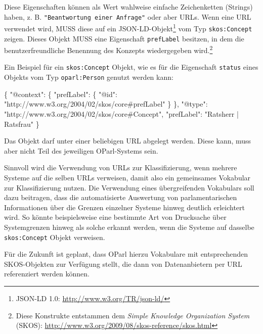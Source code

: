 \documentclass[,a4paper]{article}
\newenvironment{Shaded}{}{}
\newcommand{\DataTypeTok}[1]{\textcolor[rgb]{0.56,0.13,0.00}{{#1}}}
\newcommand{\StringTok}[1]{\textcolor[rgb]{0.25,0.44,0.63}{{#1}}}
\newcommand{\FunctionTok}[1]{\textcolor[rgb]{0.02,0.16,0.49}{{#1}}}
\begin{document}
Diese Eigenschaften können als Wert wahlweise einfache Zeichenketten
(Strings) haben, z. B. \texttt{"Beantwortung einer Anfrage"} oder aber
URLs. Wenn eine URL verwendet wird, MUSS diese auf ein
JSON-LD-Objekt\footnote{JSON-LD 1.0: \url{http://www.w3.org/TR/json-ld/}}
vom Typ \texttt{skos:Concept} zeigen. Dieses Objekt MUSS eine
Eigenschaft \texttt{prefLabel} besitzen, in dem die benutzerfreundliche
Benennung des Konzepts wiedergegeben wird.\footnote{Diese Konstrukte
  entstammen dem \emph{Simple Knowledge Organization System} (SKOS):
  \url{http://www.w3.org/2009/08/skos-reference/skos.html}}

Ein Beispiel für ein \texttt{skos:Concept} Objekt, wie es für die
Eigenschaft \texttt{status} eines Objekts vom Typ \texttt{oparl:Person}
genutzt werden kann:

\begin{Shaded}
\begin{Highlighting}[]
\FunctionTok{\{}
    \DataTypeTok{"@context"}\FunctionTok{:} \FunctionTok{\{}
        \DataTypeTok{"prefLabel"}\FunctionTok{:} \FunctionTok{\{}
            \DataTypeTok{"@id"}\FunctionTok{:} \StringTok{"http://www.w3.org/2004/02/skos/core#prefLabel"}
        \FunctionTok{\}}
    \FunctionTok{\},}
    \DataTypeTok{"@type"}\FunctionTok{:} \StringTok{"http://www.w3.org/2004/02/skos/core#Concept"}\FunctionTok{,}
    \DataTypeTok{"prefLabel"}\FunctionTok{:} \StringTok{"Ratsherr | Ratsfrau"}
\FunctionTok{\}}
\end{Highlighting}
\end{Shaded}

Das Objekt darf unter einer beliebigen URL abgelegt werden. Diese kann,
muss aber nicht Teil des jeweiligen OParl-Systems sein.

Sinnvoll wird die Verwendung von URLs zur Klassifizierung, wenn mehrere
Systeme auf die selben URLs verweisen, damit also ein gemeinsames
Vokabular zur Klassifizierung nutzen. Die Verwendung eines
übergreifenden Vokabulars soll dazu beitragen, dass die automatisierte
Auswertung von parlamentarischen Informationen über die Grenzen
einzelner Systeme hinweg deutlich erleichtert wird. So könnte
beispielsweise eine bestimmte Art von Drucksache über Systemgrenzen
hinweg als solche erkannt werden, wenn die Systeme auf dasselbe
\texttt{skos:Concept} Objekt verweisen.

Für die Zukunft ist geplant, dass OParl hierzu Vokabulare mit
entsprechenden SKOS-Objekten zur Verfügung stellt, die dann von
Datenanbietern per URL referenziert werden können.
\end{document}
